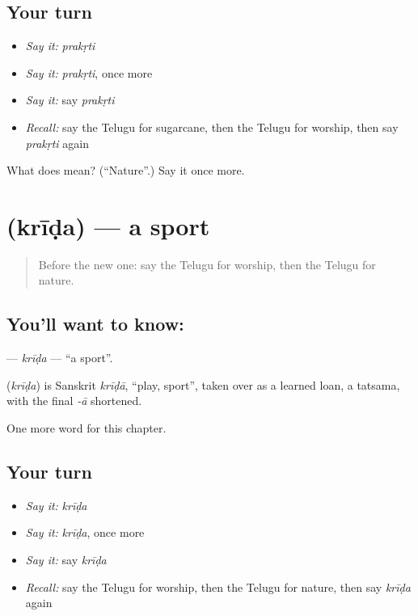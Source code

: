 \subsection*{Your turn}
\begin{itemize}
\raggedright
  \item \emph{Say it:} \emph{prakṛti}
  \item \emph{Say it:} \emph{prakṛti}, once more
  \item \emph{Say it:} say \emph{prakṛti}
  \item \emph{Recall:} say the Telugu for sugarcane, then the Telugu for worship, then say \emph{prakṛti} again
\end{itemize}

\begin{tcolorbox}[breakable,colback=teal!4,colframe=teal!35!black,title={Before you move on}]
What does  mean? (\textquotedblleft{}Nature\textquotedblright{}.) Say it once more.
\end{tcolorbox}
\section[\texorpdfstring{\te{క్రీడ} (krīḍa)}{క్రీడ (krīḍa)}]{ (krīḍa) — a sport}

\label{lesson:TE-C304-krida}



\begin{quote}
Before the new one: say the Telugu for worship, then the Telugu for nature.
\end{quote}

\subsection*{You'll want to know: }
\textbf{} — \emph{krīḍa} — \textquotedblleft{}a sport\textquotedblright{}.

\begin{cousinweb}
\textbf{} (\emph{krīḍa}) is Sanskrit \emph{krīḍā}, \textquotedblleft{}play, sport\textquotedblright{}, taken over as a learned loan, a tatsama, with the final \emph{-ā} shortened.
\end{cousinweb}

\begin{grammarlens}[title={What you've built}]
One more word for this chapter.
\end{grammarlens}

\subsection*{Your turn}
\begin{itemize}
\raggedright
  \item \emph{Say it:} \emph{krīḍa}
  \item \emph{Say it:} \emph{krīḍa}, once more
  \item \emph{Say it:} say \emph{krīḍa}
  \item \emph{Recall:} say the Telugu for worship, then the Telugu for nature, then say \emph{krīḍa} again
\end{itemize}

